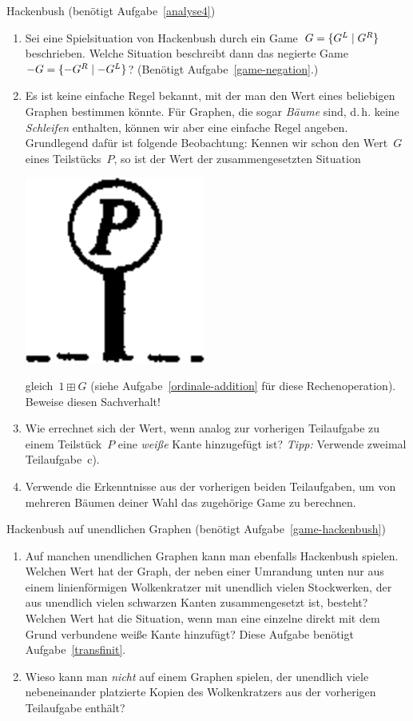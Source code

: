 \documentclass{zirkelblatt}
\begin{document}
\begin{aufgabe}{Hackenbush (benötigt Aufgabe~\ref{analyse4})}
\begin{enumerate}
\begin{center}
\end{center}
\item Sei eine Spielsituation von Hackenbush durch ein Game~$G =
\{ G^L \mathrel{|} G^R \}$ beschrieben.
Welche Situation beschreibt dann das negierte Game~$-G = \{ -G^R \mathrel{|} -G^L \}$?
(Benötigt Aufgabe~\ref{game-negation}.)
\item Es ist keine einfache Regel bekannt, mit der man den Wert eines
beliebigen Graphen bestimmen könnte. Für Graphen, die sogar \emph{Bäume} sind,
d.\,h. keine \emph{Schleifen} enthalten, können wir aber eine einfache Regel
angeben. Grundlegend dafür ist folgende Beobachtung: Kennen wir schon den
Wert~$G$ eines Teilstücks~$P$, so ist der Wert
der zusammengesetzten Situation
\begin{center}
\includegraphics[scale=0.3]{hackenbush-beispiele-3}
\end{center}
gleich~$1 \boxplus G$ (siehe Aufgabe~\ref{ordinale-addition} für diese
Rechenoperation). Beweise diesen Sachverhalt!
\item Wie errechnet sich der Wert, wenn analog zur vorherigen Teilaufgabe
zu einem Teilstück~$P$ eine \emph{weiße} Kante hinzugefügt ist? \emph{Tipp:}
Verwende zweimal Teilaufgabe~c).
\item Verwende die Erkenntnisse aus der vorherigen beiden Teilaufgaben, um von
mehreren Bäumen deiner Wahl das zugehörige Game zu berechnen.
\end{enumerate}
\end{aufgabe}

\begin{aufgabe}{Hackenbush auf unendlichen Graphen (benötigt
Aufgabe~\ref{game-hackenbush})}
\label{game-hackenbush-infinite}
\begin{enumerate}
\item Auf manchen unendlichen Graphen kann man ebenfalls Hackenbush spielen.
Welchen Wert hat der Graph, der neben einer Umrandung unten nur aus einem
linienförmigen Wolkenkratzer mit unendlich vielen Stockwerken, der aus
unendlich vielen schwarzen Kanten zusammengesetzt ist, besteht? Welchen Wert
hat die Situation, wenn man eine einzelne direkt mit dem Grund verbundene weiße
Kante hinzufügt? Diese Aufgabe benötigt Aufgabe~\ref{transfinit}.
\item Wieso kann man \emph{nicht} auf einem Graphen spielen, der unendlich
viele nebeneinander platzierte Kopien des Wolkenkratzers aus der vorherigen
Teilaufgabe enthält?
\end{enumerate}
\end{aufgabe}
\end{document}
